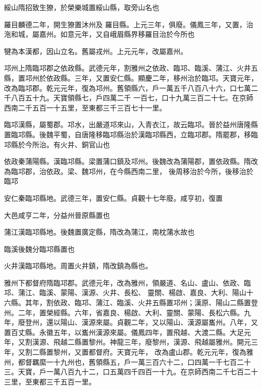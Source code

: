 \begin{pinyinscope}
 綏山隋招致生獠，於榮樂城置綏山縣，取旁山名也



 羅目麟德二年，開生獠置沐州及
 羅目縣。上元三年，俱廢。儀鳳三年，又置，治沲和城，屬嘉州。如意元年，又自峨眉縣界移羅目治於今所也



 犍為本漢都，因山立名。舊屬戎州。上元元年，改屬嘉州。



 邛州上隋臨邛郡之依政縣。武德元年，割雅州之依政、臨邛、臨溪、蒲江、火井五縣，置邛州於依政縣。三年，又置安仁縣。顯慶二年，移州治於臨邛。天寶元年，改為臨邛郡。乾元元年，復為邛州。舊領縣六，戶一萬五千八百八十六，口七萬二千八百五十九。天寶領縣七，戶四萬二千
 一百七，口十九萬三百二十七。在京師西南二千五百一十五里，至東都三千三百七十一里。



 臨邛漢縣，屬蜀郡。邛水，出嚴道邛來山，入青衣江，故云臨邛。晉於益州唐隆縣置臨邛縣。後魏平蜀，自唐隆移臨邛縣治於漢臨邛縣西，立臨邛郡。隋罷郡，移臨邛縣於今所治。有火井、銅官山也



 依政秦蒲陽縣。漢臨邛縣。梁置蒲口鎮及邛州。後魏改為蒲陽郡，置依政縣。隋改為臨邛郡，治依政。梁、魏邛州，在今縣西南二里，
 後周移治於今所，後移治於臨邛



 安仁秦臨邛縣地。武德三年，置安仁縣。貞觀十七年廢。咸亨初，復置



 大邑咸亨二年，分益州晉原縣置也



 蒲江漢臨邛縣地。後魏置廣定縣，隋改為蒲江，南枕蒲水故也



 臨溪後魏分臨邛縣置也



 火井漢臨邛縣地。周置火井鎮，隋改鎮為縣也。



 雅州下都督府隋臨邛郡。武德元年，改為雅州，領嚴道、名山、盧山、依政、臨邛、蒲江、臨溪、蒙陽、漢源、火井、長松、
 靈關、楊啟、嘉良、大利、陽山十六縣。其年，割依政、臨邛、蒲江、臨溪、火井五縣置邛州；漢原、陽山二縣置登州。二年，置榮經縣。六年，省嘉良、楊啟、大利、靈關、蒙陽、長松六縣。九年，廢登州，還以陽山、漢源來屬。貞觀二年，又以陽山、漢源屬巂州。八年，又置百丈縣。永徽五年，以巂州漢源來屬。儀鳳四年，置飛越、大渡二縣。大足元年，又割漢源、飛越二縣置黎州。神龍三年，廢黎州，漢源、飛越屬雅州。開元三年，又割二縣置黎州，又置都督府。天寶元年，
 改為盧山郡。乾元元年，復為雅州，都督羈縻一十九州也，舊領縣五，戶一萬三百六十二，口四萬一千七百二十三。天寶，戶一萬八百九十二，口五萬四千四百一十九。在京師西南二千七百二十三里，至東都三千五百一里。




\end{pinyinscope}
